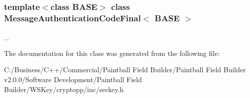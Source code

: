 \subsubsection*{template$<$class BASE$>$ class MessageAuthenticationCodeFinal$<$ BASE $>$}

\_\- 

The documentation for this class was generated from the following file:\begin{DoxyCompactItemize}
\item 
C:/Business/C++/Commercial/Paintball Field Builder/Paintball Field Builder v2.0.0/Software Development/Paintball Field Builder/WSKey/cryptopp/inc/seckey.h\end{DoxyCompactItemize}
